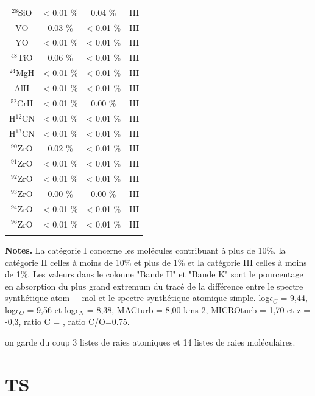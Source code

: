 \documentclass{article}
\begin{document}
\begin{table}[h!]
\begin{minipage}[t]{.4\linewidth}
\begin{center}
\begin{tabular}{cccc}
        $^{28}$SiO & < 0.01 \% & 0.04 \% & III\\
		VO &  0.03 \% &  < 0.01 \% & III\\
		YO & < 0.01 \% &  < 0.01 \%& III\\
		$^{48}$TiO &  0.06 \% &  < 0.01 \% & III\\
		$^{24}$MgH &  < 0.01 \% &  < 0.01 \% & III \\
		AlH &  < 0.01 \% &  < 0.01 \% & III \\
		$^{52}$CrH & < 0.01 \% & 0.00 \% & III\\
		H$^{12}$CN & < 0.01 \% & < 0.01 \% & III\\
		H$^{13}$CN &   < 0.01 \% & < 0.01 \% & III\\
		$^{90}$ZrO & 0.02  \% & < 0.01  \% & III\\
		$^{91}$ZrO &  < 0.01 \% &  < 0.01 \% & III\\
		$^{92}$ZrO & < 0.01 \% &  < 0.01 \% & III\\
		$^{93}$ZrO &  0.00 \% & 0.00 \% & III\\
		$^{94}$ZrO &  < 0.01 \% &  < 0.01 \% & III\\
		$^{96}$ZrO &  < 0.01 \% &  < 0.01 \% & III\\
		 &  &  \\
        \hline
    \end{tabular}
	\end{center}
\end{minipage}
\vspace{0.3cm}

\textbf{Notes.} La catégorie I concerne les molécules contribuant à plus de 10\%, la catégorie II celles à moins de 10\% et plus de 1\% et la catégorie III celles à moins de 1\%. Les valeurs dans le colonne "Bande H" et "Bande K" sont le pourcentage en absorption du plus grand extremum du tracé de la différence entre le spectre synthétique atom + mol et le spectre synthétique atomique simple. log$\epsilon_C$ = 9,44, log$\epsilon_O$ = 9,56 et log$\epsilon_N$ = 8,38, MACturb = 8,00 kms-2, MICROturb = 1,70 et z = -0,3, ratio C = , ratio C/O=0.75.
\label{contribution_mol}
\end{table}

on garde du coup 3 listes de raies atomiques et 14 listes de raies moléculaires.

\section{\sc TS}
\end{document}
